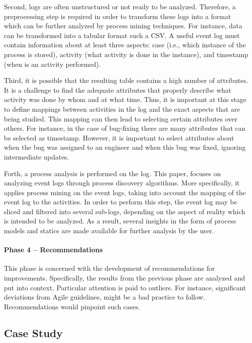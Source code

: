 Second, logs are often unstructured or not ready to be analyzed. Therefore, a preprocessing step is required in order to transform these logs into a format which can be further analyzed by process mining techniques. For instance, data can be transformed into a tabular format such a CSV. A useful event log must contain information about at least three aspects: case (i.e., which instance of the process is stored), activity (what activity is done in the instance), and timestamp (when is an activity performed).  

Third, it is possible that the resulting table contains a high number of attributes. It is a challenge to find the adequate attributes that properly describe what activity was done by whom and at what time. Thus, it is important at this stage to define mappings between activities in the log and the exact aspects that are being studied. This mapping can then lead to selecting certain attributes over others. For instance, in the case of bug-fixing there are many attributes that can be selected as timestamp. However, it is important to select attributes about when the bug was assigned to an engineer and when this bug was fixed, ignoring intermediate updates.  

Forth, a process analysis is performed on the log. This paper, focuses on analyzing event logs through process discovery algorithms. More specifically, it applies process mining on the event logs, taking into account the mapping of the event log to the activities. In order to perform this step, the event log may be sliced and filtered into several sub-logs, depending on the aspect of reality which is intended to be analyzed. As a result, several insights in the form of process models and statics are made available for further analysis by the user. 

\paragraph{Phase 4 – Recommendations}

This phase is concerned with the development of recommendations for improvements. Specifically, the results from the previous phase are analyzed and put into context. Particular attention is paid to outliers. For instance, significant deviations from Agile guidelines, might be a bad practice to follow. Recommendations would pinpoint such cases.  

\subsection{Case Study}

